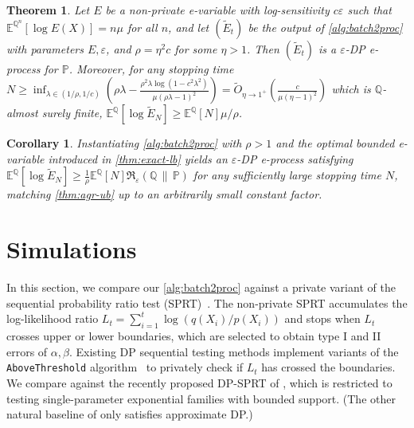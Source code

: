 \documentclass{article}
\newcommand{\Rdiv}[3][\eps]{%
  \mathfrak{R}_{#1}\!\left(#2\,\middle\|\,#3\right)%
}
\newcommand{\Null}{\mathbb{P}}
\newcommand{\E}{\mathbb{E}}
\newcommand{\Alt}{\mathbb{Q}}
\newcommand{\opt}{\Rdiv{\Alt}{\Null}}
\newcommand{\eps}{\varepsilon}
\newtheorem{theorem}{Theorem}[section]
\newtheorem{corollary}{Corollary}[theorem]
\begin{document}
\begin{theorem}\label{thm:sequential-lb}
    Let $E$ be a non-private e-variable with log-sensitivity $c\eps$ such that $\E^{\Alt^n}[\log E(X)] = n\mu$ for all $n$, and let $(\widetilde E_t)$ be the output of \cref{alg:batch2proc} with parameters $E, \eps$, and $\rho = \eta^2c$ for some $\eta>1$. Then $(\widetilde E_t)$ is a $\eps$-DP e-process for $\Null$. Moreover, for any stopping time $N \geq \inf_{\lambda \in (1/\rho,1/c)} \left(\rho\lambda - \frac{\rho^2 \lambda \log(1-c^2\lambda^2)}{\mu(\rho \lambda-1)^2}\right) = \widetilde O_{\eta\to 1^+}\left(\frac{c}{\mu(\eta-1)^2}\right)$ which is $\Alt$-almost surely finite, $\E^\Alt[\log \widetilde E_N] \geq \E^\Alt[N]\mu/\rho$.
\end{theorem}

\begin{corollary}
    Instantiating \cref{alg:batch2proc} with $\rho>1$ and the optimal bounded e-variable introduced in \cref{thm:exact-lb} yields an $\eps$-DP e-process satisfying $\E^\Alt[\log \widetilde E_N] \geq \frac{1}{\rho}\E^\Alt[N] \opt$ for any sufficiently large stopping time $N$, matching \cref{thm:agr-ub} up to an arbitrarily small constant factor.
\end{corollary}






\section{Simulations}\label{sec:simulation}


In this section, we compare our \cref{alg:batch2proc} against a private variant of the sequential probability ratio test (SPRT)~\citep{wald1945}. 
The non-private SPRT accumulates the log-likelihood ratio \(L_t=\sum_{i=1}^t \log(q(X_i)/p(X_i))\) and stops when \(L_t\) crosses upper or lower boundaries, which are selected to obtain type I and II errors of $\alpha,\beta$. 
Existing DP sequential testing methods implement variants of the \texttt{AboveThreshold} algorithm~\citep{dwork2014algorithmic} to privately check if $L_t$ has crossed the boundaries. 
We compare against the recently proposed DP-SPRT of \citet{michel2026dpsprtdifferentiallyprivatesequential}, which is restricted to testing single-parameter exponential families with bounded support.
(The other natural baseline of \citet{zhang2022DPSPRT} only satisfies approximate DP.)
\end{document}
